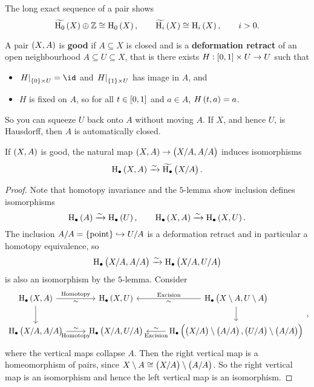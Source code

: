 \begin{exercise*}
The long exact sequence of a pair shows
$$ \widetilde{\H_0}\br{X} \oplus \ZZ \cong \H_0\br{X}, \qquad \widetilde{\H_i}\br{X} \cong \H_i\br{X}, \qquad i > 0. $$
\end{exercise*}

\begin{definition*}
A pair $ \br{X, A} $ is \textbf{good} if $ A \subseteq X $ is closed and is a \textbf{deformation retract} of an open neighbourhood $ A \subseteq U \subseteq X $, that is there exists $ H : \sbr{0, 1} \times U \to U $ such that
\begin{itemize}
\item $ \eval{H}_{\cbr{0} \times U} = \id $ and $ \eval{H}_{\cbr{1} \times U} $ has image in $ A $, and
\item $ H $ is fixed on $ A $, so for all $ t \in \sbr{0, 1} $ and $ a \in A $, $ H\br{t, a} = a $.
\end{itemize}
\end{definition*}

So you can squeeze $ U $ back onto $ A $ without moving $ A $. If $ X $, and hence $ U $, is Hausdorff, then $ A $ is automatically closed.

\begin{proposition}
If $ \br{X, A} $ is good, the natural map $ \br{X, A} \to \br{X / A, A / A} $ induces isomorphisms
$$ \H_\bullet\br{X, A} \xrightarrow{\sim} \widetilde{\H_\bullet}\br{X / A}. $$
\end{proposition}

\begin{proof}
Note that homotopy invariance and the $ 5 $-lemma show inclusion defines isomorphisms
$$ \H_\bullet\br{A} \xrightarrow{\sim} \H_\bullet\br{U}, \qquad \H_\bullet\br{X, A} \xrightarrow{\sim} \H_\bullet\br{X, U}. $$
The inclusion $ A / A = \pt \hookrightarrow U / A $ is a deformation retract and in particular a homotopy equivalence, so
$$ \H_\bullet\br{X / A, A / A} \xrightarrow{\sim} \H_\bullet\br{X / A, U / A} $$
is also an isomorphism by the $ 5 $-lemma. Consider
$$
\begin{tikzcd}
\H_\bullet\br{X, A} \arrow{r}{\text{Homotopy}}[swap]{\sim} \arrow{d} & \H_\bullet\br{X, U} & \H_\bullet\br{X \setminus A, U \setminus A} \arrow{l}{\sim}[swap]{\text{Excision}} \arrow{d} \\
\H_\bullet\br{X / A, A / A} \arrow{r}{\sim}[swap]{\text{Homotopy}} & \H_\bullet\br{X / A, U / A} & \H_\bullet\br{\br{X / A} \setminus \br{A / A}, \br{U / A} \setminus \br{A / A}} \arrow{l}{\text{Excision}}[swap]{\sim}
\end{tikzcd},
$$
where the vertical maps collapse $ A $. Then the right vertical map is a homeomorphism of pairs, since $ X \setminus A \cong \br{X / A} \setminus \br{A / A} $. So the right vertical map is an isomorphism and hence the left vertical map is an isomorphism.
\end{proof}

